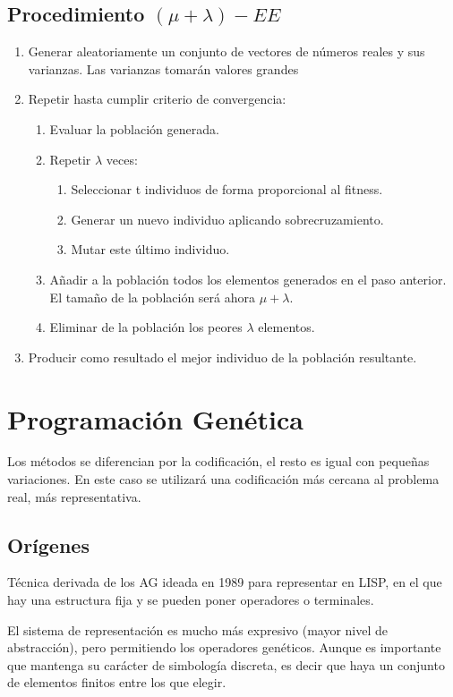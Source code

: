 \documentclass[12pt, twoside, openright]{report} %
\begin{document}
\subsection{Procedimiento $(\mu + \lambda)-EE$}
\begin{enumerate}
	\item Generar aleatoriamente un conjunto de vectores de números reales y sus varianzas. Las varianzas tomarán valores grandes
	\item Repetir hasta cumplir criterio de convergencia:
	\begin{enumerate}
		\item Evaluar la población generada.
		\item Repetir $\lambda$ veces:
		\begin{enumerate}
			\item Seleccionar t individuos de forma proporcional al fitness.
			\item Generar un nuevo individuo aplicando sobrecruzamiento.
			\item Mutar este último individuo.
		\end{enumerate}
		\item Añadir a la población todos los elementos generados en el paso anterior. El tamaño de la población será ahora $\mu + \lambda$.
		\item Eliminar de la población los peores $\lambda$ elementos.
	\end{enumerate}
	\item Producir como resultado el mejor individuo de la población resultante.
\end{enumerate}

\section{Programación Genética}
Los métodos se diferencian por la codificación, el resto es igual con pequeñas variaciones. En este caso se utilizará una codificación más cercana al problema real, más representativa.

\subsection{Orígenes}
Técnica derivada de los AG ideada en 1989 para representar en LISP, en el que hay una estructura fija y se pueden poner operadores o terminales.

El sistema de representación es mucho más expresivo (mayor nivel de abstracción), pero permitiendo los operadores genéticos. Aunque es importante que mantenga su carácter de simbología discreta, es decir que haya un conjunto de elementos finitos entre los que elegir.
\end{document}
